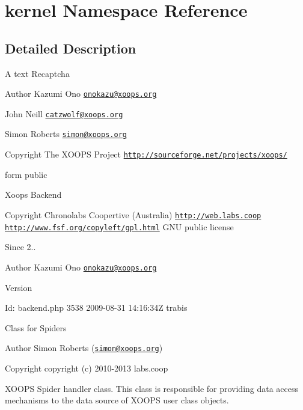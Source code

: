 \hypertarget{namespacekernel}{\section{kernel Namespace Reference}
\label{namespacekernel}
}


\subsection{Detailed Description}
A text Recaptcha

\begin{DoxyAuthor}{Author}
Kazumi Ono \href{mailto:onokazu@xoops.org}{\tt onokazu@xoops.\-org} 

John Neill \href{mailto:catzwolf@xoops.org}{\tt catzwolf@xoops.\-org} 

Simon Roberts \href{mailto:simon@xoops.org}{\tt simon@xoops.\-org} 
\end{DoxyAuthor}
\begin{DoxyCopyright}{Copyright}
The X\-O\-O\-P\-S Project \href{http://sourceforge.net/projects/xoops/}{\tt http\-://sourceforge.\-net/projects/xoops/}
\end{DoxyCopyright}
form  public

Xoops Backend

\begin{DoxyCopyright}{Copyright}
Chronolabs Coopertive (Australia) \href{http://web.labs.coop}{\tt http\-://web.\-labs.\-coop}  \href{http://www.fsf.org/copyleft/gpl.html}{\tt http\-://www.\-fsf.\-org/copyleft/gpl.\-html} G\-N\-U public license
\end{DoxyCopyright}
\begin{DoxySince}{Since}
2.. 
\end{DoxySince}
\begin{DoxyAuthor}{Author}
Kazumi Ono \href{mailto:onokazu@xoops.org}{\tt onokazu@xoops.\-org} 
\end{DoxyAuthor}
\begin{DoxyVersion}{Version}

\end{DoxyVersion}
\begin{DoxyParagraph}{Id\-:}
backend.\-php 3538 2009-\/08-\/31 14\-:16\-:34\-Z trabis 
\end{DoxyParagraph}


Class for Spiders \begin{DoxyAuthor}{Author}
Simon Roberts (\href{mailto:simon@xoops.org}{\tt simon@xoops.\-org}) 
\end{DoxyAuthor}
\begin{DoxyCopyright}{Copyright}
copyright (c) 2010-\/2013 labs.\-coop
\end{DoxyCopyright}
X\-O\-O\-P\-S Spider handler class. This class is responsible for providing data access mechanisms to the data source of X\-O\-O\-P\-S user class objects.

